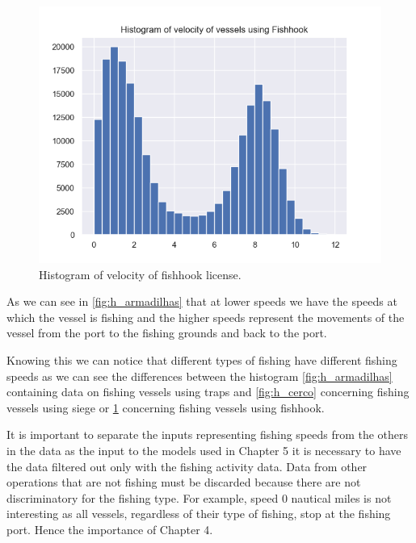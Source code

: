 \begin{figure}[h]
    \centering
    \includegraphics[width=0.8\linewidth]{Chapters/img/h_linha.png}
    \caption{Histogram of velocity of fishhook license.}
    \label{fig:h_linha}
\end{figure}

As we can see in \ref{fig:h_armadilhas} that at lower speeds we have the speeds at which the vessel is fishing and the higher speeds represent the movements of the vessel from the port to the fishing grounds and back to the port.





Knowing this we can notice that different types of fishing have different fishing speeds as we can see the differences between the histogram \ref{fig:h_armadilhas} containing data on fishing vessels using traps and \ref{fig:h_cerco} concerning fishing vessels using siege or \ref{fig:h_linha} concerning fishing vessels using fishhook.





It is important to separate the inputs representing fishing speeds from the others in the data as the input to the models used in Chapter 5 it is necessary to have the data filtered out only with the fishing activity data.
Data from other operations that are not fishing must be discarded because there are not discriminatory for the fishing type. For example, speed 0 nautical miles is not interesting as all vessels, regardless of their type of fishing, stop at the fishing port.
Hence the importance of Chapter 4.






